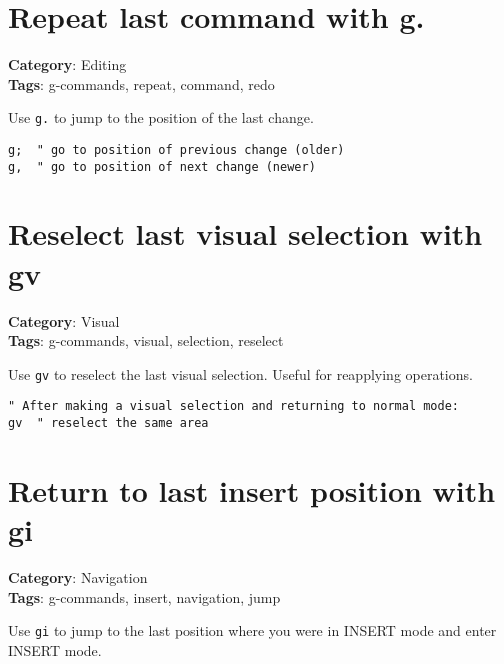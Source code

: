 {{{{{{\section{Repeat last command with g.}

\textbf{Category}: Editing\\ \textbf{Tags}: g-commands, repeat, command, redo
\vspace{0.5cm}

Use {\footnotesize \Verb§g.§} to jump to the position of the last change.

\begin{Exa*}{}
\begin{Verbatim}[fontsize=\footnotesize, breaklines, breakanywhere]
g;  " go to position of previous change (older)
g,  " go to position of next change (newer)
\end{Verbatim}
\end{Exa*}

\section{Reselect last visual selection with gv}

\textbf{Category}: Visual\\ \textbf{Tags}: g-commands, visual, selection, reselect
\vspace{0.5cm}

Use {\footnotesize \Verb§gv§} to reselect the last visual selection. Useful for reapplying operations.

\begin{Exa*}{}
\begin{Verbatim}[fontsize=\footnotesize, breaklines, breakanywhere]
" After making a visual selection and returning to normal mode:
gv  " reselect the same area
\end{Verbatim}
\end{Exa*}

\section{Return to last insert position with gi}

\textbf{Category}: Navigation\\ \textbf{Tags}: g-commands, insert, navigation, jump
\vspace{0.5cm}

Use {\footnotesize \Verb§gi§} to jump to the last position where you were in INSERT mode and enter INSERT mode.

}}}}}}
